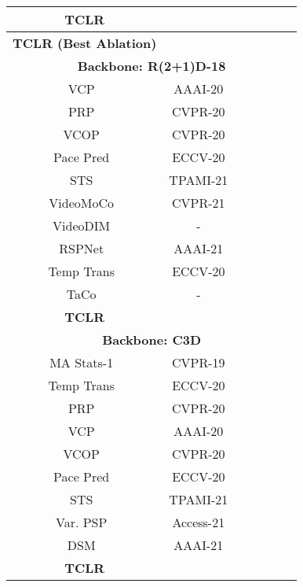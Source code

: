 \documentclass[10pt,twocolumn,letterpaper]{article}
\begin{document}
\begin{table*}
\begin{center}
\begin{tabular}{ccccccc}
\hline
\textbf{TCLR} & &  & \textcolor{red}{}  & \textcolor{red}{}  & \textcolor{red}{}  & \textcolor{red}{}  \\\hline
\textbf{TCLR (Best Ablation)} & &  & \textcolor{red}{}  & \textcolor{red}{}  & \textcolor{red}{}  & \textcolor{red}{}  \\
\hline
 \multicolumn{7}{c}{\textbf{Backbone: R(2+1)D-18}}\\
 \hline
VCP~\cite{vcp} & AAAI-20 &  &   &   &  &   \\
PRP~\cite{prp} & CVPR-20 &  &   &   &  &   \\
VCOP~\cite{vcop} & CVPR-20 &  &   &   &      &       \\
Pace Pred~\cite{pace_pred} & ECCV-20 &  &   &   &   &    \\
STS~\cite{statistics2} & TPAMI-21 &  &   &   &      &   \\
VideoMoCo~\cite{videomoco} & CVPR-21 &  &  &  &  & \\
VideoDIM~\cite{vdim} & - &  &  &  &  &   \\
RSPNet~\cite{rspnet} & AAAI-21 &  &  &  &  & \\
Temp Trans~\cite{simon} & ECCV-20 &  & \textcolor{blue}{}  & \textcolor{blue}{}  &  &   \\
TaCo~\cite{taco} & - &  &  &  &  & \\
\hline
{\bf TCLR }&  &  & \textcolor{red}{}     & \textcolor{red}{} & \textcolor{red}{} & \textcolor{red}{}      \\\hline

\hline
 \multicolumn{7}{c}{\textbf{Backbone: C3D}}\\
 \hline
MA Stats-1~\cite{statistics_cvpr19} & CVPR-19 &  &   &   &  &   \\
Temp Trans~\cite{simon} & ECCV-20 &  &   &   &  &   \\
PRP~\cite{prp} & CVPR-20 & &   &   &     &      \\
VCP~\cite{vcp} & AAAI-20 & &   &   &     &      \\
VCOP~\cite{vcop} & CVPR-20 &  &   &   &     &      \\
Pace Pred~\cite{pace_pred} & ECCV-20 & &   &   &   &    \\
STS~\cite{statistics2} & TPAMI-21 & &   &   &   &  \\
Var. PSP~\cite{cho2020self} & Access-21 &  & \textcolor{blue}{} &  &   &      \\
DSM~\cite{scene-motion} & AAAI-21 &  &  &  &  & \\
\hline
{\bf TCLR} & &  & \textcolor{red}{}     & \textcolor{red}{}  & &    \\\hline


\end{tabular}
\end{center}
\end{table*}
\end{document}

